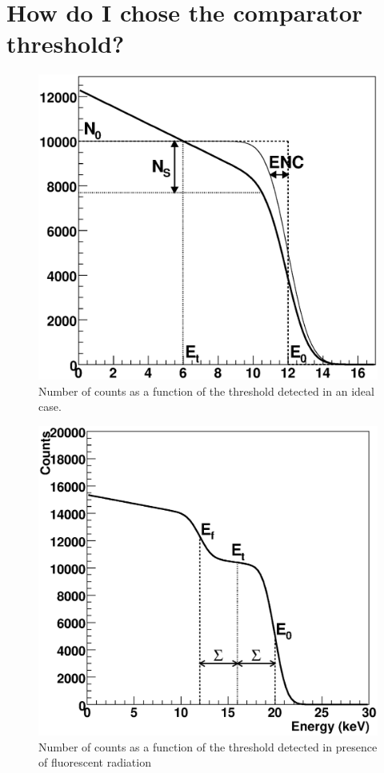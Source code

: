 \section{How do I chose the comparator threshold?}

\begin{figure}[b!]
\begin{center}
\includegraphics[width=\textwidth]{images/thr_scan_expl}
\end{center}
\caption{Number of counts as a function of the threshold detected in an ideal case.}\label{fig:thrscan}
\end{figure}

\begin{figure}[t!]
\begin{center}
\includegraphics[width=\textwidth]{images/thr_scan_fluo}
\end{center}
\caption{Number of counts as a function of the threshold detected in presence of fluorescent radiation}\label{fig:thrscanfluo}
\end{figure}

